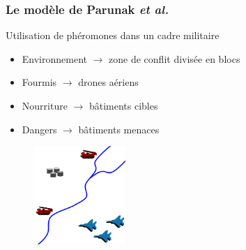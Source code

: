 \documentclass{beamer}
\begin{document}
\begin{frame}

  \frametitle{Le modèle de Parunak \textit{et al.}}

  \begin{block}{Utilisation de phéromones dans un cadre militaire}
    \begin{itemize}
    \item{Environnement  $\rightarrow$ zone de conflit divisée en blocs}
    \item{Fourmis $\rightarrow$ drones aériens}
    \item{Nourriture $\rightarrow$ bâtiments cibles}
    \item{Dangers $\rightarrow$ bâtiments menaces}
    \end{itemize}
  \end{block}

  \begin{figure}
    \centering
    \includegraphics[width=3.5cm]{terrain_real.png}
  \end{figure}

\end{frame}
\end{document}
